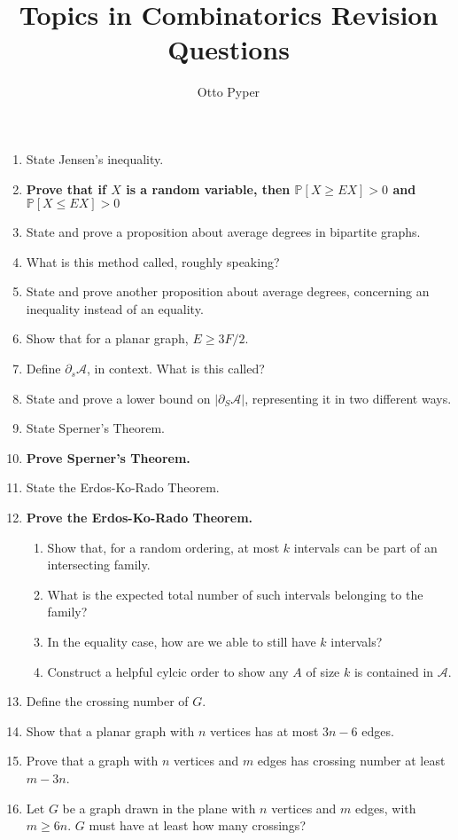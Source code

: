 \documentclass[10pt]{article}
\title{Topics in Combinatorics Revision Questions}
\author{Otto Pyper}
\date{}
\newcommand{\mc}[1]{\mathcal{#1}}
\renewcommand{\P}{\mathbb{P}}
\begin{document}
    
\maketitle

\begin{enumerate}
    \item State Jensen's inequality.
    \item \textbf{Prove that if $X$ is a random variable, then $\P[X\ge EX] > 0$ and $\P[X\le EX] > 0$}
    \item State and prove a proposition about average degrees in bipartite graphs.
    \item What is this method called, roughly speaking?
    \item State and prove another proposition about average degrees, concerning an inequality instead of an equality.
    \item Show that for a planar graph, $E\ge 3F/2$.
    \item Define $\partial_s\mc{A}$, in context. What is this called?
    \item State and prove a lower bound on $|\partial_S\mc{A}|$, representing it in two different ways.
    \item State Sperner's Theorem.
    \item \textbf{Prove Sperner's Theorem.}
    \item State the Erdos-Ko-Rado Theorem.
    \item \textbf{Prove the Erdos-Ko-Rado Theorem.}
    \begin{enumerate}
        \item Show that, for a random ordering, at most $k$ intervals can be part of an intersecting family.
        \item What is the expected total number of such intervals belonging to the family?
        \item In the equality case, how are we able to still have $k$ intervals?
        \item Construct a helpful cylcic order to show any $A$ of size $k$ is contained in $\mc{A}$.
    \end{enumerate}
    \item Define the crossing number of $G$.
    \item Show that a planar graph with $n$ vertices has at most $3n-6$ edges.
    \item Prove that a graph with $n$ vertices and $m$ edges has crossing number at least $m - 3n$.
    \item Let $G$ be a graph drawn in the plane with $n$ vertices and $m$ edges, with $m\ge 6n$. $G$ must have at least how many crossings?

\end{enumerate}
\end{document}
